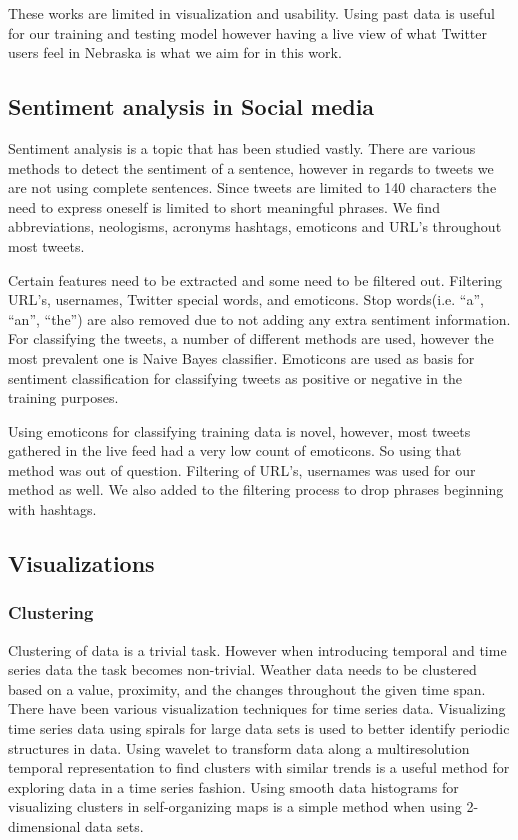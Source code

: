 \documentclass[journal]{vgtc}                %
\begin{document}
These works are limited in visualization and usability. Using past data is useful for our training and testing model however having a live view of what Twitter users feel in Nebraska is what we aim for in this work.


\subsection{Sentiment analysis in Social media}
Sentiment analysis is a topic that has been studied vastly. There are various methods to detect the sentiment of a sentence, however in regards to tweets we are not using complete sentences. Since tweets are limited to 140 characters the need to express oneself is limited to short meaningful phrases. We find abbreviations, neologisms, acronyms hashtags, emoticons and URL's throughout most tweets.

Certain features need to be extracted and some need to be filtered out. Filtering URL's, usernames, Twitter special words, and emoticons. \cite{keller2005warm} Stop words(i.e. “a”, “an”, “the”) are also removed due to not adding any extra sentiment information.  For classifying the tweets, a number of different methods are used, however the most prevalent one is Naive Bayes classifier. \cite{keller2005warm} Emoticons are used as basis for sentiment classification for classifying tweets as positive or negative in the training purposes. \cite{jain2010data,keller2005warm}

Using emoticons for classifying training data is novel, however, most tweets gathered in the live feed had a very low count of emoticons. So using that method was out of question. Filtering of URL's, usernames was used for our method as well. We also added to the filtering process to drop phrases beginning with hashtags.

\subsection{Visualizations}

\subsubsection{Clustering}
Clustering of data is a trivial task. However when introducing  temporal and time series data the task becomes non-trivial. Weather data needs to be clustered based on a value, proximity, and the changes throughout the given time span. There have been various visualization techniques for time series data. Visualizing time series data using spirals for large data sets is used to better identify periodic structures in data. \cite{pak2010twitter} Using wavelet to transform data along a multiresolution temporal representation to find clusters with similar trends is a useful method for exploring data in a time series fashion. \cite{li2014nasty} Using smooth data histograms for visualizing clusters in self-organizing maps is a simple method when using 2-dimensional data sets.\cite{pampalk2002using}
\end{document}
